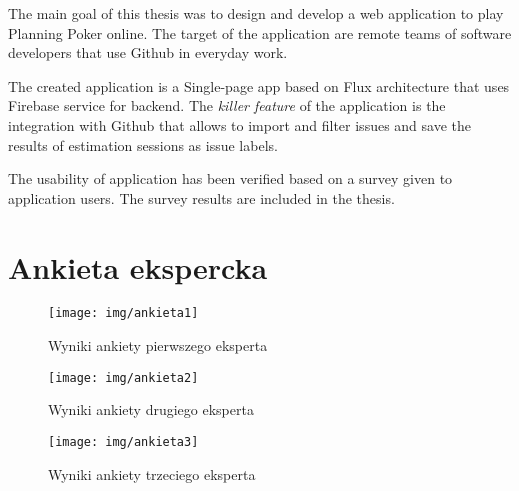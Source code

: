 \documentclass[inzynier,druk]{dyplom}
\begin{document}
The main goal of this thesis was to design and develop a web application to play
Planning Poker online. The target of the application are remote teams of software
developers that use Github in everyday work.

The created application is a Single-page app based on Flux architecture
that uses Firebase service for backend.
The \textit{killer feature} of the application is the integration with
Github that allows to import and filter issues and save the results of
estimation sessions as issue labels.

The usability of application has been verified based on a survey given to
application users. The survey results are included in the thesis.
\endgroup
{}






















\appendixpage
\appendix

\chapter{Ankieta ekspercka}\label{Dod1}

\begin{figure}
	\centering\texttt{[image: img/ankieta1]}
	\caption{Wyniki ankiety pierwszego eksperta}\label{rys:ankieta1}%
\end{figure}

\begin{figure}
	\centering\texttt{[image: img/ankieta2]}
	\caption{Wyniki ankiety drugiego eksperta}\label{rys:ankieta2}%
\end{figure}

\begin{figure}
	\centering\texttt{[image: img/ankieta3]}
	\caption{Wyniki ankiety trzeciego eksperta}\label{rys:ankieta3}%
\end{figure}
\end{document}
